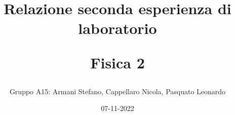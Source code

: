 %
%
%



\documentclass{article}
\usepackage{amsmath}
\usepackage{setspace}
\usepackage{anysize}
\usepackage{geometry}
\usepackage{epsfig}
\usepackage{graphicx}

\title{\huge Relazione seconda esperienza di laboratorio \par Fisica 2}
\author{Gruppo A15: Armani Stefano, Cappellaro Nicola, Pasquato Leonardo}
\date{07-11-2022}
\setlength{\parindent}{0cm}


    \maketitle
    \rule{\linewidth}{0.1mm}

    \section{Scopo dell'esperienza}
    Lo scopo della seconda esperienza di laboratorio è stato quello di prendere confidenza
    con due dei principali strumenti utilizzabili nello studio di una rete circuitale:
    il generatore di forme d'onda e l'oscilloscopio.\par
    Per comprendere al meglio il loro funzionamento e l'utilizzo, sono stati applicati
    ad un semplice circuito RC, a cui sono state date in ingresso diverse forme d'onda e 
    sono state studiate le risposte della rete a tali ingressi grazie all'oscilloscopio. 
    
    \section{Cenni teorici}

